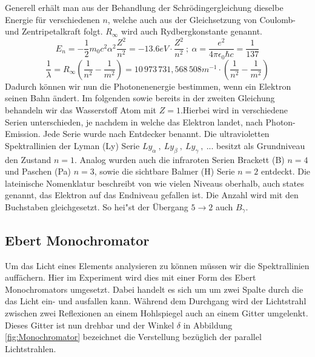 \documentclass[]{article}
\begin{document}
Generell erhält man aus der Behandlung der Schrödingergleichung dieselbe Energie für verschiedenen $n$, welche auch aus der Gleichsetzung von Coulomb- und Zentripetalkraft folgt. $R_\infty$ wird auch Rydbergkonstante genannt. 
\begin{equation}\label{eq:Energieniveaus_H}
E_n = -\frac{1}{2} m_0 c^2 \alpha^2 \frac{Z^2}{n^2} = -13.6eV \cdot \frac{Z^2}{n^2} \: ; \: \alpha = \frac{e^2}{4\pi\epsilon_0 \hbar c} = \frac{1}{137}
\end{equation}
\begin{equation}\label{eq:rydberg}
\frac{1}{\lambda} = R_\infty \left(\frac{1}{n^2} - \frac{1}{m^2} \right)  = 10\,973\,731{,}568\,508 m^{-1} \cdot \left(\frac{1}{n^2} - \frac{1}{m^2} \right)
\end{equation}
Dadurch können wir nun die Photonenenergie bestimmen, wenn ein Elektron seinen Bahn ändert. Im folgenden sowie bereits in der zweiten Gleichung behandeln wir das Wasserstoff Atom mit $Z=1$.Hierbei wird in verschiedene Serien unterschieden, je nachdem in welche das Elektron landet, nach Photon-Emission. Jede Serie wurde nach Entdecker benannt. Die ultravioletten Spektrallinien der Lyman (Ly) Serie $Ly_\alpha \:,\: Ly_\beta \:,\: Ly_\gamma \:,\: ...$ besitzt als Grundniveau den Zustand $n=1$. Analog wurden auch die infraroten Serien Brackett (B) $n=4$ und Paschen (Pa) $n=3$, sowie die sichtbare Balmer (H) Serie $n=2$ entdeckt. 
Die lateinische Nomenklatur beschreibt von wie vielen Niveaus oberhalb, auch states genannt, das Elektron auf das Endniveau gefallen ist. Die Anzahl wird mit den Buchstaben gleichgesetzt. So hei"st der \"Ubergang $5 \rightarrow 2$ auch $B_\gamma$.

\subsection{Ebert Monochromator}
Um das Licht eines Elements analysieren zu können müssen wir die Spektrallinien auffächern. Hier im Experiment wird dies mit einer Form des Ebert Monochromators umgesetzt. Dabei handelt es sich um um zwei  Spalte durch die das Licht ein- und ausfallen kann. Während dem Durchgang wird der Lichtstrahl zwischen zwei Reflexionen an einem Hohlspiegel auch an einem Gitter umgelenkt. Dieses Gitter ist nun drehbar und der Winkel $\delta$ in  Abbildung \ref{fig:Monochromator} bezeichnet die Verstellung bezüglich der parallel Lichtstrahlen. 
\end{document}
